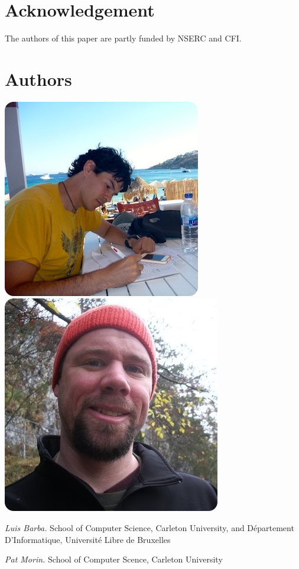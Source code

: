 \documentclass{patmorin}
\begin{document}
\section*{Acknowledgement}

The authors of this paper are partly funded by NSERC and CFI.




\newpage

\section*{Authors}

\noindent
\includegraphics[width=.475\textwidth]{luis-b}%
\hspace{.1\textwidth}%
\includegraphics[width=.475\textwidth]{pat-b}%

\noindent\emph{Luis Barba.}
School of Computer Science, Carleton University, and D\'epartement
D'Informatique, Universit\'e Libre de Bruxelles

\noindent\emph{Pat Morin.}
School of Computer Scence, Carleton University
\end{document}
